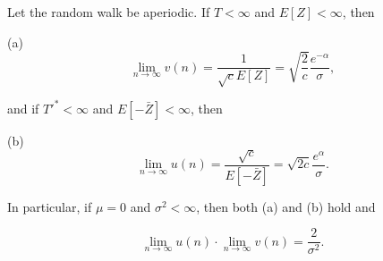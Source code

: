 Let the random walk be aperiodic. If $T < \infty$ and $E[Z] < \infty$, then

(a) $$\lim_{n \to \infty} v(n) = \frac{1}{\sqrt{c} E[Z]} = \sqrt{\frac{2}{c}} \frac{e^{-\alpha}}{\sigma},$$

and if $T'^* < \infty$ and $E[-\bar{Z}] < \infty$, then

(b) $$\lim_{n \to \infty} u(n) = \frac{\sqrt{c}}{E[-\bar{Z}]} = \sqrt{2c} \frac{e^{\alpha}}{\sigma}.$$

In particular, if $\mu = 0$ and $\sigma^2 < \infty$, then both (a) and (b) hold and

$$\lim_{n \to \infty} u(n) \cdot \lim_{n \to \infty} v(n) = \frac{2}{\sigma^2}.$$